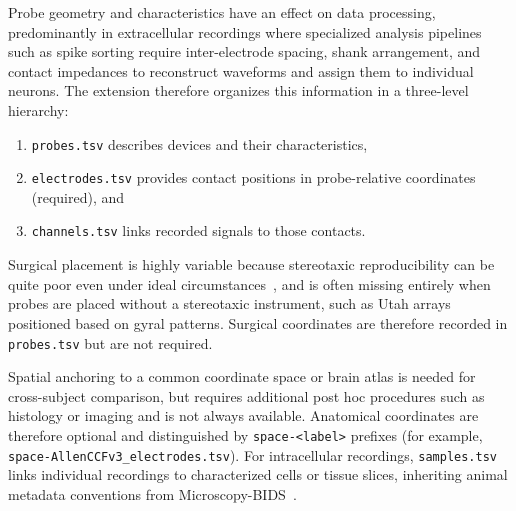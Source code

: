 \documentclass[fleqn,10pt]{article}
\begin{document}
Probe geometry and characteristics have an effect on data processing, predominantly in extracellular recordings where specialized analysis pipelines such as spike sorting require inter-electrode spacing, shank arrangement, and contact impedances to reconstruct waveforms and assign them to individual neurons.
The extension therefore organizes this information in a three-level hierarchy:
\begin{enumerate}[noitemsep]
    \item \verb|probes.tsv| describes devices and their characteristics,
    \item \verb|electrodes.tsv| provides contact positions in probe-relative coordinates (required), and
    \item \verb|channels.tsv| links recorded signals to those contacts.
\end{enumerate}

Surgical placement is highly variable because stereotaxic reproducibility can be quite poor even under ideal circumstances~\citep{international_brain_laboratory_reproducibility_2025}, and is often missing entirely when probes are placed without a stereotaxic instrument, such as Utah arrays positioned based on gyral patterns.
Surgical coordinates are therefore recorded in \verb|probes.tsv| but are not required.

Spatial anchoring to a common coordinate space or brain atlas is needed for cross-subject comparison, but requires additional post hoc procedures such as histology or imaging and is not always available.
Anatomical coordinates are therefore optional and distinguished by \verb|space-<label>| prefixes (for example, \verb|space-AllenCCFv3_electrodes.tsv|).
For intracellular recordings, \verb|samples.tsv| links individual recordings to characterized cells or tissue slices, inheriting animal metadata conventions from Microscopy-BIDS~\citep{bourget_microscopy-bids_2022}.
\end{document}

